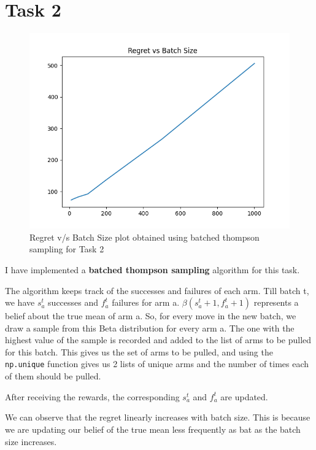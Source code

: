 \documentclass{article}
\begin{document}
\newpage
\thispagestyle{fancy}
\section{Task 2}
\begin{figure}[H]
    \centerline{\includegraphics[scale=0.75]{task2-20220902-060224.png}}
    \caption{Regret v/s Batch Size plot obtained using batched thompson sampling for Task 2}
\end{figure}

I have implemented a \textbf{batched thompson sampling} algorithm for this task. 

The algorithm keeps track of the successes and failures of each arm.
Till batch t, we have $s_{a}^{t}$ successes and $f_{a}^{t}$ failures for arm a.  
$\beta(s_{a}^{t}+1,f_{a}^{t}+1)$ represents a belief about the true mean of arm a.
So, for every move in the new batch, we draw a sample from this Beta distribution for every arm a. The
one with the highest value of the sample is recorded and added to the list of arms to be pulled for this batch.
This gives us the set of arms to be pulled, and using the \verb!np.unique! function gives us 2 lists of
unique arms and the number of times each of them should be pulled.

After receiving the rewards, the corresponding $s_{a}^{t}$ and $f_{a}^{t}$ are updated.

We can observe that the regret linearly increases with batch size. This is because we are 
updating our belief of the true mean less frequently as bat as the batch size increases.

\newpage
\thispagestyle{fancy}
\end{document}
